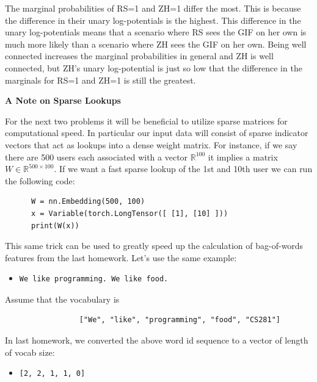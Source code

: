 \documentclass[10pt]{harvardml}
\theoremstyle{plain}
\begin{document}
\begin{enumerate}[label=(\alph*)]
The marginal probabilities of RS=1 and ZH=1 differ the most. This is because the difference in their unary log-potentials is the highest. This difference in the unary log-potentials means that a scenario where RS sees the GIF on her own is much more likely than a scenario where ZH sees the GIF on her own. Being well connected increases the marginal probabilities in general and ZH is well connected, but ZH's unary log-potential is just so low that the difference in the marginals for RS=1 and ZH=1 is still the greatest.
\end{enumerate}

\newpage

\textbf{A Note on Sparse Lookups}
\vspace{0.5cm}

\noindent For the next two problems it will be beneficial to utilize sparse
matrices for computational speed. In particular our input data will consist
of sparse indicator vectors that act as lookups into a dense weight matrix. For instance, if
we say there are 500 users each associated with a vector
$\mathbb{R}^{100}$ it implies a matrix $W \in \mathbb{R}^{500 \times
  100}$. If we want a fast sparse lookup of the 1st and 10th user we can run
the following code:


\begin{verbatim}
      W = nn.Embedding(500, 100)
      x = Variable(torch.LongTensor([ [1], [10] ]))
      print(W(x))
\end{verbatim}


\noindent

This same trick can be used to greatly speed up
the calculation of bag-of-words features from the
last homework. Let's use the same example:
\begin{itemize}
\item \begin{verbatim}We like programming. We like food.\end{verbatim}
\end{itemize}
Assume that the vocabulary is
\begin{verbatim}
                 ["We", "like", "programming", "food", "CS281"]
\end{verbatim}

In last homework, we converted the above word id sequence to a vector of length of vocab size:
\begin{itemize}
\item \begin{verbatim}[2, 2, 1, 1, 0]\end{verbatim}
\end{itemize}
\end{document}
